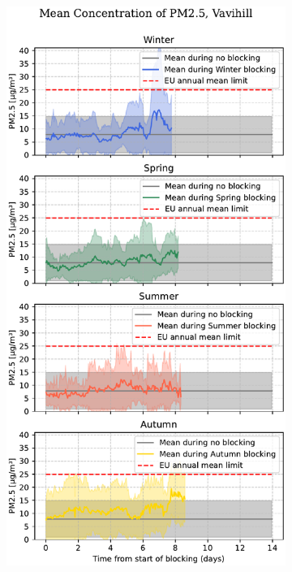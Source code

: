 \begin{figure}[H]
    \centering
    \begin{subfigure}[b]{0.49\textwidth}
        \centering
        \includegraphics[width=\textwidth]{Figures/Meanplot_seasonal_Vavihill.pdf}

\end{subfigure}
\end{figure}
